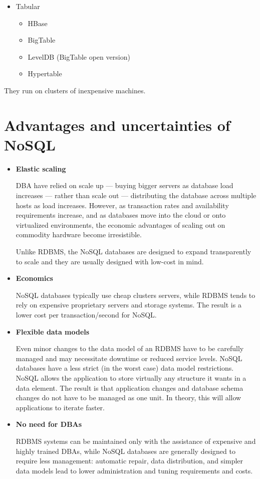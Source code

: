 \begin{itemize}
\item Tabular

  \begin{itemize}
    \item HBase
    \item BigTable
    \item LevelDB (BigTable open version)
    \item Hypertable
  \end{itemize}
  

\end{itemize}

They run on clusters of inexpensive machines.




\section{Advantages and uncertainties of NoSQL}

\begin{itemize}

\item \textbf{Elastic scaling}

DBA have relied on scale up — buying bigger servers as database load increases — rather than scale out — distributing the database across multiple hosts as load increases. However, as transaction rates and availability requirements increase, and as databases move into the cloud or onto virtualized environments, the economic advantages of scaling out on commodity hardware become irresistible.

Unlike RDBMS, the NoSQL databases are designed to expand transparently to scale and they are usually designed with low-cost in mind.


\item \textbf{Economics}

NoSQL databases typically use cheap clusters servers, while RDBMS tends to rely on expensive proprietary servers and storage systems. The result is a lower cost per transaction/second for NoSQL.


\item \textbf{Flexible data models}

Even minor changes to the data model of an RDBMS have to be carefully managed and may necessitate downtime or reduced service levels. NoSQL databases have a less strict (in the worst case) data model restrictions. NoSQL allows the application to store virtually any structure it wants in a data element. The result is that application changes and database schema changes do not have to be managed as one unit. In theory, this will allow applications to iterate faster.

\item \textbf{No need for DBAs}

RDBMS systems can be maintained only with the assistance of expensive and highly trained DBAs, while NoSQL databases are generally designed to require less management:  automatic repair, data distribution, and simpler data models lead to lower administration and tuning requirements and costs.



\end{itemize}


